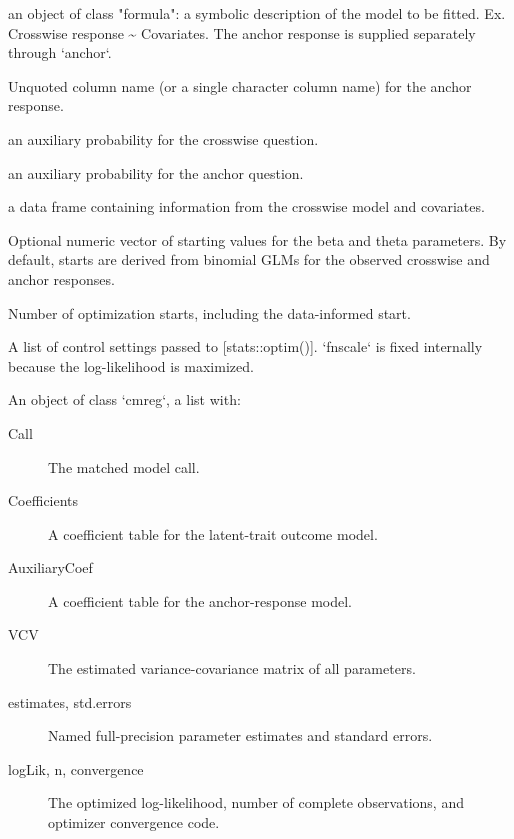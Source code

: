 \documentclass[a4paper]{book}
\begin{document}
\begin{Arguments}
\begin{ldescription}
\item[\code{formula}] an object of class "formula":
a symbolic description of the model to be fitted.
Ex. Crosswise response \textasciitilde{} Covariates. The anchor response is supplied
separately through `anchor`.

\item[\code{anchor}] Unquoted column name (or a single character column name) for the
anchor response.

\item[\code{p}] an auxiliary probability for the crosswise question.

\item[\code{p.prime}] an auxiliary probability for the anchor question.

\item[\code{data}] a data frame containing information from the crosswise model and covariates.

\item[\code{start}] Optional numeric vector of starting values for the beta and theta
parameters. By default, starts are derived from binomial GLMs for the observed
crosswise and anchor responses.

\item[\code{n.start}] Number of optimization starts, including the data-informed start.

\item[\code{control}] A list of control settings passed to [stats::optim()]. `fnscale`
is fixed internally because the log-likelihood is maximized.
\end{ldescription}
\end{Arguments}
%
\begin{Value}
An object of class `cmreg`, a list with:
\begin{description}

\item[Call] The matched model call.
\item[Coefficients] A coefficient table for the latent-trait outcome model.
\item[AuxiliaryCoef] A coefficient table for the anchor-response model.
\item[VCV] The estimated variance-covariance matrix of all parameters.
\item[estimates, std.errors] Named full-precision parameter estimates and
standard errors.
\item[logLik, n, convergence] The optimized log-likelihood, number of
complete observations, and optimizer convergence code.

\end{description}

\end{Value}
\end{document}
